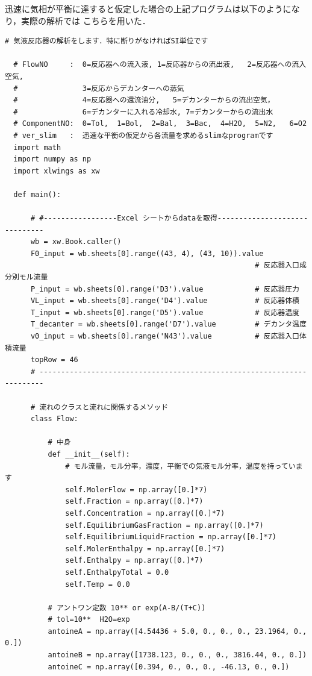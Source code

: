 \documentclass[a4j]{jsreport}
\begin{document}
迅速に気相が平衡に達すると仮定した場合の上記プログラムは以下のようになり，実際の解析では
こちらを用いた．
\begin{lstlisting}[caption=気液反応器の解析(迅速に平衡)]
  # 気液反応器の解析をします．特に断りがなければSI単位です

  # FlowNO     :  0=反応器への流入液, 1=反応器からの流出液,   2=反応器への流入空気,
  #               3=反応からデカンターへの蒸気
  #               4=反応器への還流油分,   5=デカンターからの流出空気，
  #               6=デカンターに入れる冷却水, 7=デカンターからの流出水
  # ComponentNO:  0=Tol,  1=Bol,  2=Bal,  3=Bac,  4=H2O,  5=N2,   6=O2
  # ver_slim   :  迅速な平衡の仮定から各流量を求めるslimなprogramです
  import math
  import numpy as np
  import xlwings as xw

  def main():

      # #-----------------Excel シートからdataを取得------------------------------
      wb = xw.Book.caller()
      F0_input = wb.sheets[0].range((43, 4), (43, 10)).value
                                                          # 反応器入口成分別モル流量
      P_input = wb.sheets[0].range('D3').value            # 反応器圧力
      VL_input = wb.sheets[0].range('D4').value           # 反応器体積
      T_input = wb.sheets[0].range('D5').value            # 反応器温度
      T_decanter = wb.sheets[0].range('D7').value         # デカンタ温度
      v0_input = wb.sheets[0].range('N43').value          # 反応器入口体積流量
      topRow = 46
      # -----------------------------------------------------------------------

      # 流れのクラスと流れに関係するメソッド
      class Flow:

          # 中身
          def __init__(self):
              # モル流量，モル分率，濃度，平衡での気液モル分率，温度を持っています
              self.MolerFlow = np.array([0.]*7)
              self.Fraction = np.array([0.]*7)
              self.Concentration = np.array([0.]*7)
              self.EquilibriumGasFraction = np.array([0.]*7)
              self.EquilibriumLiquidFraction = np.array([0.]*7)
              self.MolerEnthalpy = np.array([0.]*7)
              self.Enthalpy = np.array([0.]*7)
              self.EnthalpyTotal = 0.0
              self.Temp = 0.0

          # アントワン定数 10** or exp(A-B/(T+C))
          # tol=10**  H2O=exp
          antoineA = np.array([4.54436 + 5.0, 0., 0., 0., 23.1964, 0., 0.])
          antoineB = np.array([1738.123, 0., 0., 0., 3816.44, 0., 0.])
          antoineC = np.array([0.394, 0., 0., 0., -46.13, 0., 0.])


\end{lstlisting}
\end{document}

